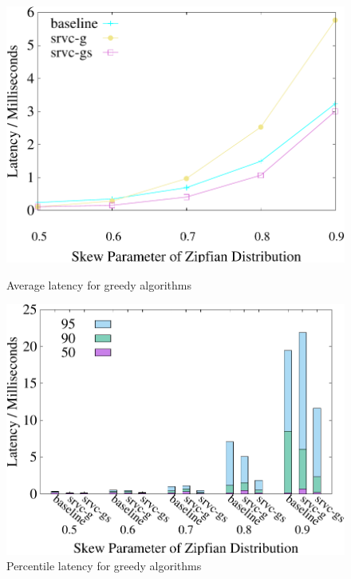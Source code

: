 \begin{figure}[t]
    \centering
    \begin{minipage}[b]{0.32\linewidth}
	\centering
	\includegraphics[width=\textwidth]{./exp_fig/greedy/latency}
	\vspace{-2em}
	\caption{Average latency for greedy algorithms}
	\label{fig:greedy:latency}
	\end{minipage}
    \begin{minipage}[b]{0.32\linewidth}
        \centering
        \includegraphics[width=\textwidth]{./exp_fig/greedy/percent95_latency}
        \vspace{-2em}
        \caption{Percentile latency for greedy algorithms}
        \label{fig:greedy:p95}

\end{minipage}
\end{figure}
